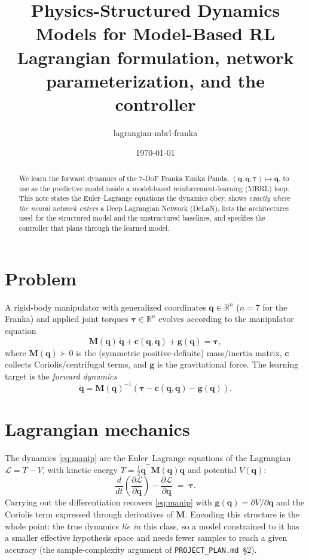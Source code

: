 \documentclass[11pt]{article}
\title{Physics-Structured Dynamics Models for Model-Based RL\\
\large Lagrangian formulation, network parameterization, and the controller}
\author{lagrangian-mbrl-franka}
\date{\today}
\newcommand{\q}{\bm{q}}
\newcommand{\qd}{\dot{\bm{q}}}
\newcommand{\qdd}{\ddot{\bm{q}}}
\newcommand{\R}{\mathbb{R}}
\newcommand{\M}{\bm{M}}
\begin{document}
\maketitle

\begin{abstract}
We learn the forward dynamics of the 7-DoF Franka Emika Panda,
$(\q,\qd,\bm{\tau})\mapsto\qdd$, to use as the predictive model inside a
model-based reinforcement-learning (MBRL) loop. This note states the
Euler--Lagrange equations the dynamics obey, shows \emph{exactly where the
neural network enters} a Deep Lagrangian Network (DeLaN), lists the architectures
used for the structured model and the unstructured baselines, and specifies the
controller that plans through the learned model.
\end{abstract}

\section{Problem}
A rigid-body manipulator with generalized coordinates $\q\in\R^{n}$
($n=7$ for the Franka) and applied joint torques $\bm{\tau}\in\R^{n}$ evolves
according to the manipulator equation
\begin{equation}
\M(\q)\,\qdd + \bm{c}(\q,\qd) + \bm{g}(\q) = \bm{\tau},
\label{eq:manip}
\end{equation}
where $\M(\q)\succ0$ is the (symmetric positive-definite) mass/inertia matrix,
$\bm{c}$ collects Coriolis/centrifugal terms, and $\bm{g}$ is the gravitational
force. The learning target is the \emph{forward dynamics}
\begin{equation}
\qdd = \M(\q)^{-1}\!\left(\bm{\tau}-\bm{c}(\q,\qd)-\bm{g}(\q)\right).
\label{eq:fwd}
\end{equation}

\section{Lagrangian mechanics}
The dynamics \eqref{eq:manip} are the Euler--Lagrange equations of the Lagrangian
$\mathcal{L}=T-V$, with kinetic energy $T=\tfrac12\qd^{\top}\M(\q)\qd$ and
potential $V(\q)$:
\begin{equation}
\frac{d}{dt}\!\left(\frac{\partial \mathcal{L}}{\partial \qd}\right)
-\frac{\partial \mathcal{L}}{\partial \q} \;=\; \bm{\tau}.
\label{eq:el}
\end{equation}
Carrying out the differentiation recovers \eqref{eq:manip} with
$\bm{g}(\q)=\partial V/\partial\q$ and the Coriolis term expressed through
derivatives of $\M$. Encoding this structure is the whole point: the true
dynamics \emph{lie in} this class, so a model constrained to it has a smaller
effective hypothesis space and needs fewer samples to reach a given accuracy
(the sample-complexity argument of \texttt{PROJECT\_PLAN.md}~\S2).
\end{document}
